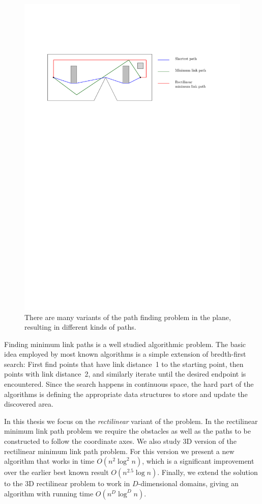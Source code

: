 \documentclass[english,gradu]{tktltiki2018}
\begin{document}
\begin{figure}\centering
	\includegraphics{fig/paths}
	\caption{There are many variants of the path finding problem in the plane, resulting in different kinds of paths.}\label{fig:paths}
\end{figure}

Finding minimum link paths is a well studied algorithmic problem.
The basic idea employed by most known algorithms is a simple extension of bredth-first search:
First find points that have link distance~1 to the starting point, then points with link distance~2, and similarly iterate until the desired endpoint is encountered.
Since the search happens in continuous space, the hard part of the algorithms is defining the appropriate data structures to store and update the discovered area.

In this thesis we focus on the \emph{rectilinear} variant of the problem.
In the rectilinear minimum link path problem we require the obstacles as well as the paths to be constructed to follow the coordinate axes.
We also study 3D version of the rectilinear minimum link path problem.
For this version we present a new algorithm that works in time $O(n^2\log^2n)$, which is a significant improvement over the earlier best known result $O(n^{2.5}\log n)$.\cite{restricted}
Finally, we extend the solution to the 3D rectilinear problem to work in $D$-dimensional domains, giving an algorithm with running time $O(n^D\log^Dn)$.
\end{document}
